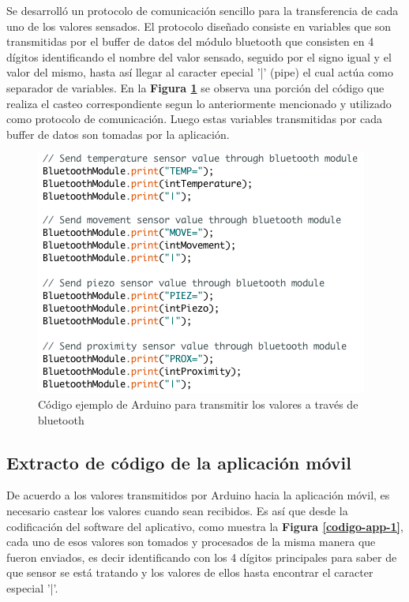 \documentclass{IEEEtran}
\begin{document}
			Se desarrolló un protocolo de comunicación sencillo para la transferencia de cada uno de los valores sensados. El protocolo diseñado consiste en variables que son transmitidas por el buffer de datos del módulo bluetooth que consisten en 4 dígitos identificando el nombre del valor sensado, seguido por el signo igual y el valor del mismo, hasta así llegar al caracter epecial '|' (pipe) el cual actúa como separador de variables. En la \textbf{Figura \ref{codigo-arduino-2}} se observa una porción del código que realiza el casteo correspondiente segun lo anteriormente mencionado y utilizado como protocolo de comunicación. Luego estas variables transmitidas por cada buffer de datos son tomadas por la aplicación.
 
			\begin{figure}
				\centering
				\includegraphics[width=1\linewidth]{codigo-arduino-2}
				\caption{Código ejemplo de Arduino para transmitir los valores a través de bluetooth}
				\label{codigo-arduino-2}
			\end{figure}

		\subsection{Extracto de código de la aplicación móvil}	
			
			 De acuerdo a los valores transmitidos por Arduino hacia la aplicación móvil, es necesario castear los valores cuando sean recibidos. Es así que desde la codificación del software del aplicativo, como muestra la \textbf{Figura \ref{codigo-app-1}}, cada uno de esos valores son tomados y procesados de la misma manera que fueron enviados, es decir identificando con los 4 dígitos principales para saber de que sensor se está tratando y los valores de ellos hasta encontrar el caracter especial '|'.
\end{document}
